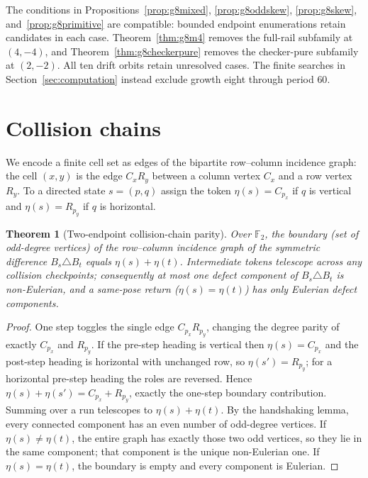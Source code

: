 \documentclass[11pt,letterpaper]{article}
\theoremstyle{plain}
\newtheorem{theorem}{Theorem}[section]
\theoremstyle{definition}
\newcommand{\F}{\mathbb{F}}
\begin{document}
\begin{NoHyper}
The conditions in Propositions~\ref{prop:g8mixed},
\ref{prop:g8oddskew}, \ref{prop:g8skew}, and~\ref{prop:g8primitive} are
compatible: bounded endpoint enumerations retain candidates in each case.
Theorem~\ref{thm:g8m4} removes the full-rail subfamily at $(4,-4)$, and
Theorem~\ref{thm:g8checkerpure} removes the checker-pure subfamily at $(2,-2)$.
All ten drift orbits retain unresolved cases. The finite searches in
Section~\ref{sec:computation} instead exclude growth eight through period $60$.

\section{Collision chains}\label{sec:interlace}

We encode a finite cell set as edges of the bipartite row--column incidence graph:
the cell $(x,y)$ is the edge $C_xR_y$ between a column vertex $C_x$ and a row vertex
$R_y$. To a directed state $s=(p,q)$ assign the token $\eta(s)=C_{p_x}$ if $q$ is
vertical and $\eta(s)=R_{p_y}$ if $q$ is horizontal.

\begin{theorem}[Two-endpoint collision-chain parity]\label{thm:collision}
Over $\F_2$, the boundary (set of odd-degree vertices) of the row--column incidence
graph of the symmetric difference $B_s\triangle B_t$ equals $\eta(s)+\eta(t)$.
Intermediate tokens telescope across any collision checkpoints; consequently at most
one defect component of $B_s\triangle B_t$ is non-Eulerian, and a same-pose return
($\eta(s)=\eta(t)$) has only Eulerian defect components.
\end{theorem}

\begin{proof}
One step toggles the single edge $C_{p_x}R_{p_y}$, changing the degree parity of
exactly $C_{p_x}$ and $R_{p_y}$. If the pre-step heading is vertical then
$\eta(s)=C_{p_x}$ and the post-step heading is horizontal with unchanged row, so
$\eta(s')=R_{p_y}$; for a horizontal pre-step heading the roles are reversed. Hence
$\eta(s)+\eta(s')=C_{p_x}+R_{p_y}$, exactly the one-step boundary contribution.
Summing over a run telescopes to
$\eta(s)+\eta(t)$. By the handshaking lemma, every connected component has an even
number of odd-degree vertices. If $\eta(s)\ne\eta(t)$, the entire graph has exactly
those two odd vertices, so they lie in the same component; that component is the
unique non-Eulerian one. If $\eta(s)=\eta(t)$, the boundary is empty and every
component is Eulerian.
\end{proof}


\end{NoHyper}
\end{document}
